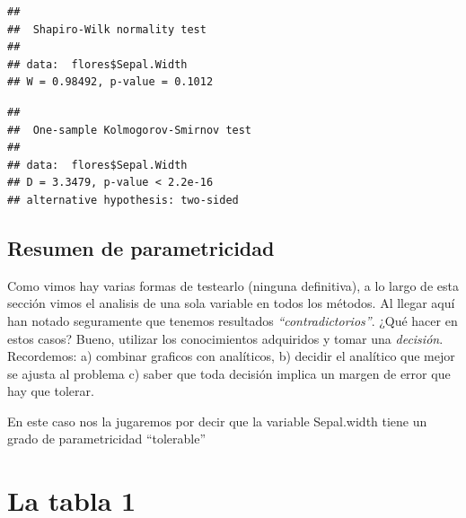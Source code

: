 \documentclass[
]{book}
\newenvironment{Shaded}{\begin{snugshade}}{\end{snugshade}}
\newcommand{\CommentTok}[1]{\textcolor[rgb]{0.56,0.35,0.01}{\textit{#1}}}
\newcommand{\FunctionTok}[1]{\textcolor[rgb]{0.00,0.00,0.00}{#1}}
\newcommand{\NormalTok}[1]{#1}
\newcommand{\SpecialCharTok}[1]{\textcolor[rgb]{0.00,0.00,0.00}{#1}}
\newcommand{\StringTok}[1]{\textcolor[rgb]{0.31,0.60,0.02}{#1}}
\begin{document}
\begin{Shaded}
\end{Shaded}

\begin{verbatim}
## 
##  Shapiro-Wilk normality test
## 
## data:  flores$Sepal.Width
## W = 0.98492, p-value = 0.1012
\end{verbatim}

\begin{Shaded}
\end{Shaded}

\begin{verbatim}
## 
##  One-sample Kolmogorov-Smirnov test
## 
## data:  flores$Sepal.Width
## D = 3.3479, p-value < 2.2e-16
## alternative hypothesis: two-sided
\end{verbatim}

\hypertarget{resumen-de-parametricidad}{%
\subsection{Resumen de parametricidad}\label{resumen-de-parametricidad}}

Como vimos hay varias formas de testearlo (ninguna definitiva), a lo largo de esta sección vimos el analisis de una sola variable en todos los métodos. Al llegar aquí han notado seguramente que tenemos resultados \emph{``contradictorios''}. ¿Qué hacer en estos casos? Bueno, utilizar los conocimientos adquiridos y tomar una \emph{decisión}. Recordemos: a) combinar graficos con analíticos, b) decidir el analítico que mejor se ajusta al problema c) saber que toda decisión implica un margen de error que hay que tolerar.

En este caso nos la jugaremos por decir que la variable Sepal.width tiene un grado de parametricidad ``tolerable''

\hypertarget{la-tabla-1}{%
\section{La tabla 1}\label{la-tabla-1}}
\end{document}
